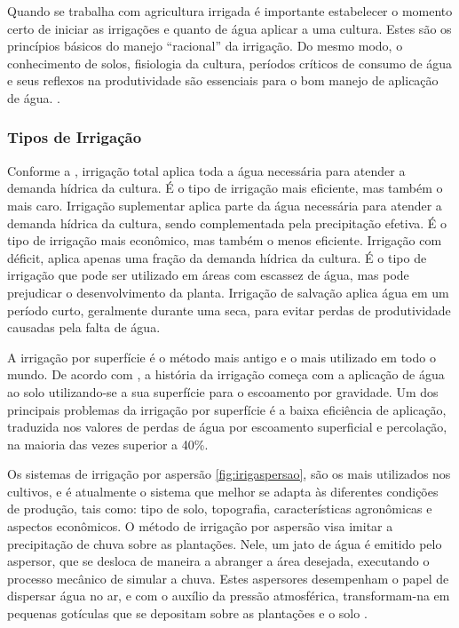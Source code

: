 \documentclass[%
  article,%
  a4paper,%
  12pt,%
  fleqn,%
  oneside,%
  chapter = TITLE,%
  section = TITLE,%
]{abntex2}
\begin{document}
Quando se trabalha com agricultura irrigada é importante estabelecer o momento certo de iniciar as irrigações e quanto de água aplicar a uma cultura. Estes são os princípios básicos do manejo “racional” da irrigação. Do mesmo modo, o conhecimento de solos, fisiologia da cultura, períodos críticos de consumo de água e seus reflexos na produtividade são essenciais para o bom manejo de aplicação de água. \cite{Embrapa2008v2}.

\subsubsection{Tipos de Irrigação }	
Conforme a \citet{Embrapa2008v2}, irrigação total aplica toda a água necessária para atender a demanda hídrica da cultura. É o tipo de irrigação mais eficiente, mas também o mais caro. Irrigação suplementar aplica parte da água necessária para atender a demanda hídrica da cultura, sendo complementada pela precipitação efetiva. É o tipo de irrigação mais econômico, mas também o menos eficiente. Irrigação com déficit, aplica apenas uma fração da demanda hídrica da cultura. É o tipo de irrigação que pode ser utilizado em áreas com escassez de água, mas pode prejudicar o desenvolvimento da planta. Irrigação de salvação aplica água em um período curto, geralmente durante uma seca, para evitar perdas de produtividade causadas pela falta de água.

A irrigação por superfície é o método mais antigo e o mais utilizado em todo o mundo. De acordo com \citet{Cuenca1989v2}, a história da irrigação começa com a aplicação de água ao solo utilizando-se a sua superfície para o escoamento por gravidade.
Um dos principais problemas da irrigação por superfície é a baixa eficiência de aplicação, traduzida nos valores de perdas de água por escoamento superficial e percolação, na maioria das vezes superior a 40\%.

Os sistemas de irrigação por aspersão \cref{fig:irigaspersao}, são os mais utilizados nos cultivos, e é atualmente o sistema que melhor se adapta às diferentes condições de produção, tais como: tipo de solo, topografia, características agronômicas e aspectos econômicos. O método de irrigação por aspersão visa imitar a precipitação de chuva sobre as plantações. Nele, um jato de água é emitido pelo aspersor, que se desloca de maneira a abranger a área desejada, executando o processo mecânico de simular a chuva. Estes aspersores desempenham o papel de dispersar água no ar, e com o auxílio da pressão atmosférica, transformam-na em pequenas gotículas que se depositam sobre as plantações e o solo \cite{bernardo2006manual}.
\end{document}
